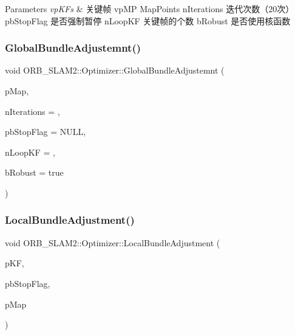 \begin{DoxyParams}{Parameters}
{\em vp\+K\+Fs} & 关键帧 vp\+MP Map\+Points n\+Iterations 迭代次数（20次） pb\+Stop\+Flag 是否强制暂停 n\+Loop\+KF 关键帧的个数 b\+Robust 是否使用核函数 \\
\hline
\end{DoxyParams}
\mbox{\label{class_o_r_b___s_l_a_m2_1_1_optimizer_aaa9b8a4c16296bf2981b0aaf4ee3189c}} 
\subsubsection{\texorpdfstring{Global\+Bundle\+Adjustemnt()}{GlobalBundleAdjustemnt()}}
{\footnotesize\ttfamily void O\+R\+B\+\_\+\+S\+L\+A\+M2\+::\+Optimizer\+::\+Global\+Bundle\+Adjustemnt (\begin{DoxyParamCaption}\item[{\mbox{\hyperlink{class_o_r_b___s_l_a_m2_1_1_map}{Map}} $\ast$}]{p\+Map,  }\item[{int}]{n\+Iterations = {},  }\item[{bool $\ast$}]{pb\+Stop\+Flag = {\ttfamily NULL},  }\item[{const unsigned long}]{n\+Loop\+KF = {},  }\item[{const bool}]{b\+Robust = {\ttfamily true} }\end{DoxyParamCaption})\hspace{0.3cm}{\ttfamily [static]}}

\mbox{\label{class_o_r_b___s_l_a_m2_1_1_optimizer_ab70e0b4f366b65a0c1ae8b2def19d339}} 
\subsubsection{\texorpdfstring{Local\+Bundle\+Adjustment()}{LocalBundleAdjustment()}}
{\footnotesize\ttfamily void O\+R\+B\+\_\+\+S\+L\+A\+M2\+::\+Optimizer\+::\+Local\+Bundle\+Adjustment (\begin{DoxyParamCaption}\item[{\mbox{\hyperlink{class_o_r_b___s_l_a_m2_1_1_key_frame}{Key\+Frame}} $\ast$}]{p\+KF,  }\item[{bool $\ast$}]{pb\+Stop\+Flag,  }\item[{\mbox{\hyperlink{class_o_r_b___s_l_a_m2_1_1_map}{Map}} $\ast$}]{p\+Map }\end{DoxyParamCaption})\hspace{0.3cm}{\ttfamily [static]}}



